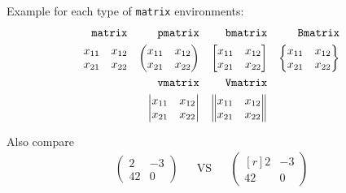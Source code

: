 \documentclass[11pt, a4paper, english]{report}
\begin{document}
		Example for each type of \texttt{matrix} environments:
		\begin{align*}
			\text{\texttt{matrix}} && \text{\texttt{pmatrix}} && \text{\texttt{bmatrix}} && \text{\texttt{Bmatrix}} \\
			\begin{matrix}
				x_{11} & x_{12} \\
				x_{21} & x_{22} \\
			\end{matrix} 
			&&
			\begin{pmatrix}
				x_{11} & x_{12} \\
				x_{21} & x_{22} \\
			\end{pmatrix}
			&&
			\begin{bmatrix}
				x_{11} & x_{12} \\
				x_{21} & x_{22} \\
			\end{bmatrix}
			&&
			\begin{Bmatrix}
				x_{11} & x_{12} \\
				x_{21} & x_{22} \\
			\end{Bmatrix} \\
			&& \text{\texttt{vmatrix}} && \text{\texttt{Vmatrix}} && \\
			&&
			\begin{vmatrix}
				x_{11} & x_{12} \\
				x_{21} & x_{22} \\
			\end{vmatrix}
			&&
			\begin{Vmatrix}
				x_{11} & x_{12} \\
				x_{21} & x_{22} \\
			\end{Vmatrix}
			&& 
		\end{align*}
		
		Also compare
		\begin{align*}
			\begin{pmatrix}
				2  & -3 \\
				42 & 0
			\end{pmatrix}
			&&
			\text{VS}
			&&
			\begin{pmatrix*}[r]
				2  & -3 \\
				42 & 0
			\end{pmatrix*}
		\end{align*}
%
\end{document}
